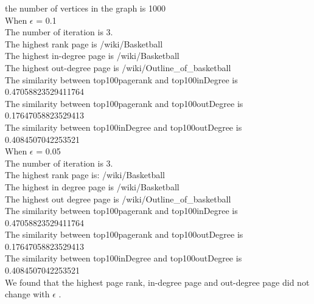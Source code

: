 \documentclass{article}
\begin{document}
the number of vertices in the graph is 1000 \\
When $\epsilon$ = 0.1\\
The number of iteration is 3.\\
The highest rank page is /wiki/Basketball\\
The highest in-degree page is /wiki/Basketball\\
The highest out-degree page is /wiki/Outline\_of\_basketball\\
The similarity between top100pagerank and top100inDegree is 0.47058823529411764\\
The similarity between top100pagerank and top100outDegree is 0.17647058823529413\\
The similarity between top100inDegree and top100outDegree is 0.4084507042253521\\

When $\epsilon$ = 0.05\\
The number of iteration is 3.\\
The highest rank page is: /wiki/Basketball\\
The highest in degree page is /wiki/Basketball\\
The highest out degree page is /wiki/Outline\_of\_basketball\\
The similarity between top100pagerank and top100inDegree is 0.47058823529411764\\
The similarity between top100pagerank and top100outDegree is 0.17647058823529413\\
The similarity between top100inDegree and top100outDegree is 0.4084507042253521\\

We found that the highest page rank, in-degree page and out-degree page did not change with $\epsilon$ .
\end{document}
